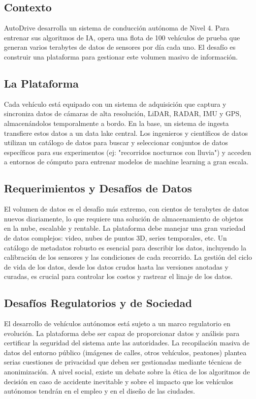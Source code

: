 \documentclass[12pt]{article}
\begin{document}
\subsection{Contexto}
AutoDrive desarrolla un sistema de conducción autónoma de Nivel 4. Para entrenar sus algoritmos de IA, opera una flota de 100 vehículos de prueba que generan varios terabytes de datos de sensores por día cada uno. El desafío es construir una plataforma para gestionar este volumen masivo de información.

\subsection{La Plataforma}
Cada vehículo está equipado con un sistema de adquisición que captura y sincroniza datos de cámaras de alta resolución, LiDAR, RADAR, IMU y GPS, almacenándolos temporalmente a bordo. En la base, un sistema de ingesta transfiere estos datos a un data lake central. Los ingenieros y científicos de datos utilizan un catálogo de datos para buscar y seleccionar conjuntos de datos específicos para sus experimentos (ej: "recorridos nocturnos con lluvia") y acceden a entornos de cómputo para entrenar modelos de machine learning a gran escala.

\subsection{Requerimientos y Desafíos de Datos}
El volumen de datos es el desafío más extremo, con cientos de terabytes de datos nuevos diariamente, lo que requiere una solución de almacenamiento de objetos en la nube, escalable y rentable. La plataforma debe manejar una gran variedad de datos complejos: video, nubes de puntos 3D, series temporales, etc. Un catálogo de metadatos robusto es esencial para describir los datos, incluyendo la calibración de los sensores y las condiciones de cada recorrido. La gestión del ciclo de vida de los datos, desde los datos crudos hasta las versiones anotadas y curadas, es crucial para controlar los costos y rastrear el linaje de los datos.

\subsection{Desafíos Regulatorios y de Sociedad}
El desarrollo de vehículos autónomos está sujeto a un marco regulatorio en evolución. La plataforma debe ser capaz de proporcionar datos y análisis para certificar la seguridad del sistema ante las autoridades. La recopilación masiva de datos del entorno público (imágenes de calles, otros vehículos, peatones) plantea serias cuestiones de privacidad que deben ser gestionadas mediante técnicas de anonimización. A nivel social, existe un debate sobre la ética de los algoritmos de decisión en caso de accidente inevitable y sobre el impacto que los vehículos autónomos tendrán en el empleo y en el diseño de las ciudades.
\end{document}
